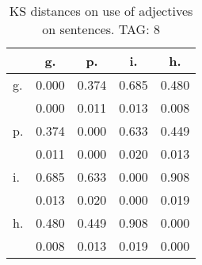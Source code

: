 \begin{table}[h!]
\begin{center}
\begin{tabular}{| l | c | c | c | c |}\hline
 & g. & p. & i. & h. \\\hline
g. & 0.000  & 0.374  & 0.685  & 0.480 \\\hline
 & 0.000  & 0.011  & 0.013  & 0.008 \\\hline
p. & 0.374  & 0.000  & 0.633  & 0.449 \\\hline
 & 0.011  & 0.000  & 0.020  & 0.013 \\\hline
i. & 0.685  & 0.633  & 0.000  & 0.908 \\\hline
 & 0.013  & 0.020  & 0.000  & 0.019 \\\hline
h. & 0.480  & 0.449  & 0.908  & 0.000 \\\hline
 & 0.008  & 0.013  & 0.019  & 0.000 \\\hline
\end{tabular}
\caption{KS distances on use of adjectives on sentences. TAG: 8}
\end{center}
\end{table}